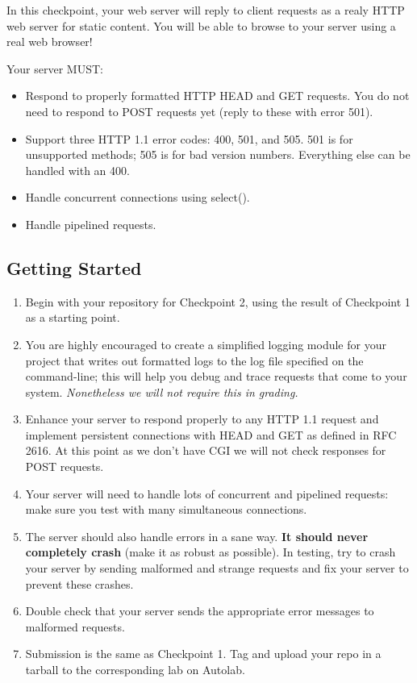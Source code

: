 \label{sec:cp2}
In this checkpoint, your web server will reply to client requests as a realy HTTP web server for static content. You will be able to browse to your server using a real web browser!

\vspace{5pt}

\noindent Your server MUST:
\begin{itemize}
  \item Respond to properly formatted HTTP HEAD and GET requests. You do not need to respond to POST requests yet (reply to these with error 501).
    \item Support three HTTP 1.1 error codes: 400, 501, and 505. 501 is for unsupported methods; 505 is for bad version numbers. Everything else can be handled with an 400.
    \item Handle concurrent connections using select().
    \item Handle pipelined requests.
\end{itemize}

\subsection{Getting Started}
\begin{enumerate}
\item Begin with your repository for Checkpoint 2, using the result of Checkpoint 1 as a starting point.
\item You are highly encouraged to create a simplified logging module for your project that writes out formatted logs to the log file specified on the command-line; this will help you debug and trace requests that come to your system. {\it Nonetheless we will not require this in grading.}
\item Enhance your server to respond properly to any HTTP 1.1 request and implement persistent connections with HEAD and GET as defined in RFC 2616. At this point as we don't have CGI we will not check responses for POST requests.
\item Your server will need to handle lots of concurrent and pipelined requests: make sure you test with many simultaneous connections.
\item The server should also handle errors in a sane way. {\bf It should never completely crash} (make it as robust as possible). In testing, try to crash your server by sending malformed and strange requests and fix your server to prevent these crashes.
\item Double check that your server sends the appropriate error messages to malformed requests.
\item Submission is the same as Checkpoint 1. Tag and upload your repo in a tarball to the corresponding lab on Autolab.
\end{enumerate}


